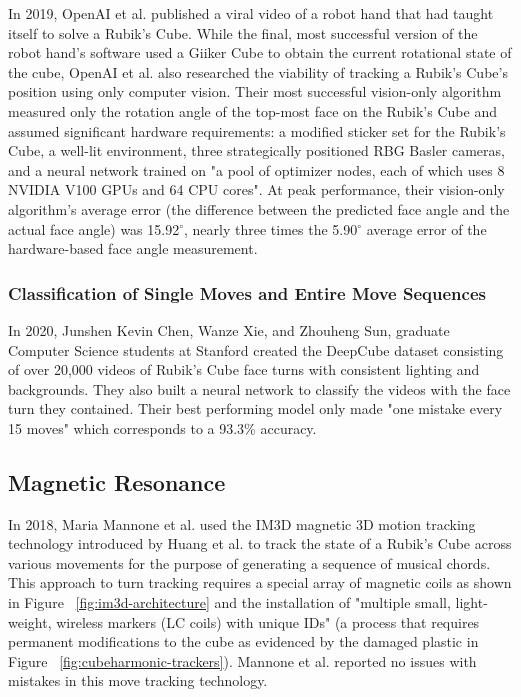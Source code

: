 In 2019, OpenAI et al. published a viral video of a robot hand that had
taught itself to solve a Rubik's Cube. While the final, most successful
version of the robot hand's software used a Giiker Cube to obtain the
current rotational state of the cube, OpenAI et al. also researched the
viability of tracking a Rubik's Cube's position using only computer
vision. Their most successful vision-only algorithm measured only the
rotation angle of the top-most face on the Rubik's Cube and assumed
significant hardware requirements: a modified sticker set for the
Rubik's Cube, a well-lit environment, three strategically positioned
RBG Basler cameras, and a neural network trained on "a pool of
optimizer nodes, each of which uses 8 NVIDIA V100 GPUs and 64 CPU
cores". At peak performance, their vision-only algorithm's average
error (the difference between the predicted face angle and the actual
face angle) was 15.92$^\circ$, nearly three times the 5.90$^\circ$
average error of the hardware-based face angle measurement.
\cite{openai2019rubiks}

\subsubsection{Classification of Single Moves and Entire Move Sequences}

In 2020, Junshen Kevin Chen, Wanze Xie, and Zhouheng Sun, graduate
Computer Science students at Stanford created the DeepCube dataset
consisting of over 20,000 videos of Rubik's Cube face turns with
consistent lighting and backgrounds. They also built a neural network
to classify the videos with the face turn they contained. Their best
performing model only made "one mistake every 15 moves" which
corresponds to a 93.3\% accuracy. \cite{chendeepcube}


\subsection{Magnetic Resonance}

In 2018, Maria Mannone et al. used the IM3D magnetic 3D motion tracking
technology introduced by Huang et al. \cite{im3d} to track the state of
a Rubik's Cube across various movements for the purpose of generating a
sequence of musical chords. This approach to turn tracking requires a
special array of magnetic coils as shown in Figure
~\ref{fig:im3d-architecture} and the installation of "multiple small,
light-weight, wireless markers (LC coils) with unique IDs" (a process
that requires permanent modifications to the cube as evidenced by the
damaged plastic in Figure ~\ref{fig:cubeharmonic-trackers}). Mannone et
al. reported no issues with mistakes in this move tracking technology.
\cite{mannone-cubeharmonic-2018}

